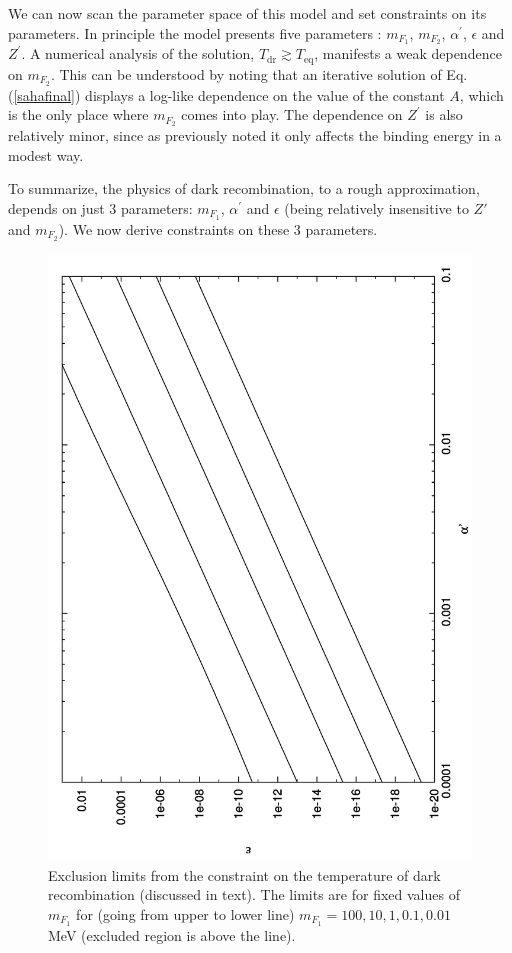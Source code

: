\documentclass[12pt]{article}
\begin{document}
We can now scan the parameter space of this model and set constraints on its parameters. In principle the model presents five parameters : $m _{F_1}$, $m _{F_2}$, $\alpha ^{'}$, $\epsilon$ and $Z ^{'}$. A numerical analysis of the solution, $T _{\text{dr}} \gtrsim T _{\text{eq}}$, manifests a weak dependence on $m _{F_2}$. This can be understood by noting that an iterative solution of Eq.(\ref{sahafinal}) displays a log-like dependence on the value of the constant $A$, which is the only place where $m _{F_2}$ comes into play. The dependence on $Z ^{'}$ is also relatively minor, since as previously noted it only affects the binding energy in a modest way.

To summarize, the physics of dark recombination, to a rough approximation, depends on just 3 parameters: $m _{F_1}$, $\alpha ^{'}$ and $\epsilon$ (being relatively insensitive to $Z'$ and $m _{F_2}$). We now derive constraints on these 3 parameters.

\begin{figure}[htpb]
    \centering
        \includegraphics[scale=0.45, angle=270]{fig11}
    \caption{Exclusion limits from the constraint on the temperature of dark recombination (discussed in text). The limits are for fixed values of $m _{F_1}$ for (going from upper to lower line) $m _{F_1} = 100, 10, 1, 0.1, 0.01$ MeV (excluded region is above the line).}
    \label{fig:Exclusion dark recombination mf1}
\end{figure}
\end{document}
